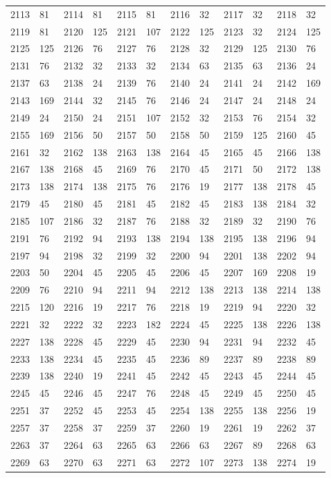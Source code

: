 \begin{longtable}{llllllllllll}
2113 & 81&2114 &81&2115& 81&2116 &32&2117 &32&2118& 32\\
2119 & 81&2120 &125&2121& 107&2122 &125&2123 &32&2124& 125\\
2125 & 125&2126 &76&2127& 76&2128 &32&2129 &125&2130& 76\\
2131 & 76&2132 &32&2133& 32&2134 &63&2135 &63&2136& 24\\
2137 & 63&2138 &24&2139& 76&2140 &24&2141 &24&2142& 169\\
2143 & 169&2144 &32&2145& 76&2146 &24&2147 &24&2148& 24\\
2149 & 24&2150 &24&2151& 107&2152 &32&2153 &76&2154& 32\\
2155 & 169&2156 &50&2157& 50&2158 &50&2159 &125&2160& 45\\
2161 & 32&2162 &138&2163& 138&2164 &45&2165 &45&2166& 138\\
2167 & 138&2168 &45&2169& 76&2170 &45&2171 &50&2172& 138\\
2173 & 138&2174 &138&2175& 76&2176 &19&2177 &138&2178& 45\\
2179 & 45&2180 &45&2181& 45&2182 &45&2183 &138&2184& 32\\
2185 & 107&2186 &32&2187& 76&2188 &32&2189 &32&2190& 76\\
2191 & 76&2192 &94&2193& 138&2194 &138&2195 &138&2196& 94\\
2197 & 94&2198 &32&2199& 32&2200 &94&2201 &138&2202& 94\\
2203 & 50&2204 &45&2205& 45&2206 &45&2207 &169&2208& 19\\
2209 & 76&2210 &94&2211& 94&2212 &138&2213 &138&2214& 138\\
2215 & 120&2216 &19&2217& 76&2218 &19&2219 &94&2220& 32\\
2221 & 32&2222 &32&2223& 182&2224 &45&2225 &138&2226& 138\\
2227 & 138&2228 &45&2229& 45&2230 &94&2231 &94&2232& 45\\
2233 & 138&2234 &45&2235& 45&2236 &89&2237 &89&2238& 89\\
2239 & 138&2240 &19&2241& 45&2242 &45&2243 &45&2244& 45\\
2245 & 45&2246 &45&2247& 76&2248 &45&2249 &45&2250& 45\\
2251 & 37&2252 &45&2253& 45&2254 &138&2255 &138&2256& 19\\
2257 & 37&2258 &37&2259& 37&2260 &19&2261 &19&2262& 37\\
2263 & 37&2264 &63&2265& 63&2266 &63&2267 &89&2268& 63\\
2269 & 63&2270 &63&2271& 63&2272 &107&2273 &138&2274& 19\\

\end{longtable}
